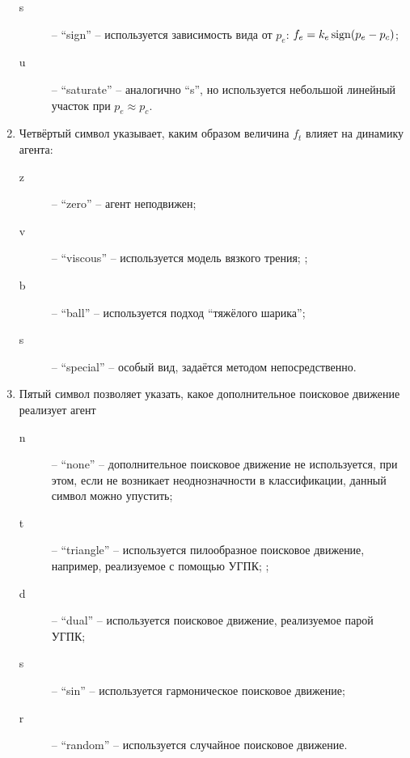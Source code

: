 \begin{enumerate}
\begin{description}
      \item[s] -- ``sign'' -- используется зависимость вида
        от $p_e$: $f_e = k_e \operatorname*{sign}( p_e - p_c )$;

      \item[u] -- ``saturate'' -- аналогично ``s'', но используется небольшой
        линейный участок при $p_e \approx p_c$.

    \end{description}


  \item
    Четвёртый символ указывает, каким образом величина $f_t$ влияет на динамику агента:
    \begin{description}

      \item[z]  -- ``zero'' -- агент неподвижен;

      \item[v] -- ``viscous'' --  используется модель вязкого трения; ;

      \item[b] -- ``ball'' -- используется подход ``тяжёлого шарика'';

      \item[s] -- ``special'' -- особый вид, задаётся методом непосредственно.

    \end{description}

  \item
    Пятый символ позволяет указать, какое дополнительное поисковое движение
    реализует агент
    \begin{description}

      \item[n]  -- ``none'' -- дополнительное поисковое движение не используется,
        при этом, если не возникает неоднозначности в классификации, данный символ можно упустить;

      \item[t] -- ``triangle'' --  используется пилообразное поисковое движение, например, реализуемое
        с помощью УГПК; ;

      \item[d] -- ``dual'' -- используется поисковое движение, реализуемое парой УГПК;

      \item[s] -- ``sin'' --  используется гармоническое поисковое движение;

      \item[r] -- ``random'' --  используется случайное поисковое движение.


\end{description}
\end{enumerate}

